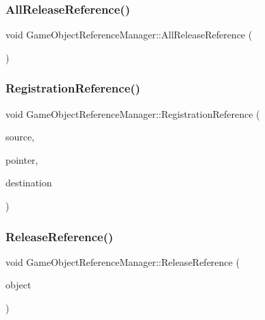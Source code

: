 \subsubsection{\texorpdfstring{All\+Release\+Reference()}{AllReleaseReference()}}
{\footnotesize\ttfamily void Game\+Object\+Reference\+Manager\+::\+All\+Release\+Reference (\begin{DoxyParamCaption}{ }\end{DoxyParamCaption})}

\mbox{\label{class_game_object_reference_manager_ac8e7ea130fc9b3645f95d7db5d4ad667}} 
\subsubsection{\texorpdfstring{Registration\+Reference()}{RegistrationReference()}}
{\footnotesize\ttfamily void Game\+Object\+Reference\+Manager\+::\+Registration\+Reference (\begin{DoxyParamCaption}\item[{\mbox{\hyperlink{class_game_object_origin}{Game\+Object\+Origin}} $\ast$}]{source,  }\item[{void $\ast$}]{pointer,  }\item[{\mbox{\hyperlink{class_game_object_origin}{Game\+Object\+Origin}} $\ast$}]{destination }\end{DoxyParamCaption})}

\mbox{\label{class_game_object_reference_manager_a34f9974bf2d2930ee10f7a3a7f6c51d5}} 
\subsubsection{\texorpdfstring{Release\+Reference()}{ReleaseReference()}}
{\footnotesize\ttfamily void Game\+Object\+Reference\+Manager\+::\+Release\+Reference (\begin{DoxyParamCaption}\item[{\mbox{\hyperlink{class_game_object_origin}{Game\+Object\+Origin}} $\ast$}]{object }\end{DoxyParamCaption})}



